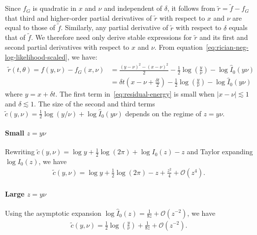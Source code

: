 \documentclass{article}
\begin{document}
Since $f_G$ is quadratic in $x$ and $\nu$ and independent of $\delta$, it follows from $\tilde{r} = \tilde{f} - f_G$ that third and higher-order partial derivatives of $\tilde{r}$ with respect to $x$ and $\nu$ are equal to those of $\tilde{f}$.
Similarly, any partial derivative of $\tilde{r}$ with respect to $\delta$ equals that of $\tilde{f}$.
We therefore need only derive stable expressions for $\tilde{r}$ and its first and second partial derivatives with respect to $x$ and $\nu$.
From equation~\eqref{eq:rician-neg-log-likelihood-scaled}, we have:
%
\begin{align}
  \tilde{r}(t,\theta) = f(y, \nu) - f_G(x,\nu) & = \frac{(y-\nu)^2 - (x-\nu)^2}{2} - \frac{1}{2}\log\left(\frac{y}{\nu}\right) - \log \hat{I}_0(y \nu)                                               \\
                                               & = \delta t \left(x - \nu + \frac{\delta t}{2}\right) - \frac{1}{2}\log\left(\frac{y}{\nu}\right) - \log \hat{I}_0(y \nu) \label{eq:residual-energy}
\end{align}
%
where $y = x + \delta t$.
The first term in~\eqref{eq:residual-energy} is small when $|x-\nu| \lesssim 1$ and $\delta \lesssim 1$.
The size of the second and third terms $\tilde{c}(y,\nu) = \frac{1}{2}\log(y/\nu) + \log\hat{I}_0(y\nu)$ depends on the regime of $z=y\nu$.

\paragraph{Small $z=y\nu$}

Rewriting $\tilde{c}(y,\nu) = \log y + \frac{1}{2}\log(2\pi) + \log I_0(z) - z$ and Taylor expanding $\log I_0(z)$, we have
%
\begin{align}\label{eq:c-small-z}
  \tilde{c}(y,\nu) = \log y + \frac{1}{2}\log(2\pi) - z + \frac{z^2}{4} + \mathcal{O}(z^4).
\end{align}

\paragraph{Large $z=y\nu$}

Using the asymptotic expansion $\log \hat{I}_0(z) = \frac{1}{8z} + \mathcal{O}(z^{-2})$, we have
%
\begin{align}\label{eq:c-large-z}
  \tilde{c}(y,\nu) = \frac{1}{2}\log\left(\frac{y}{\nu}\right) + \frac{1}{8z} + \mathcal{O}(z^{-2}).
\end{align}
\end{document}
